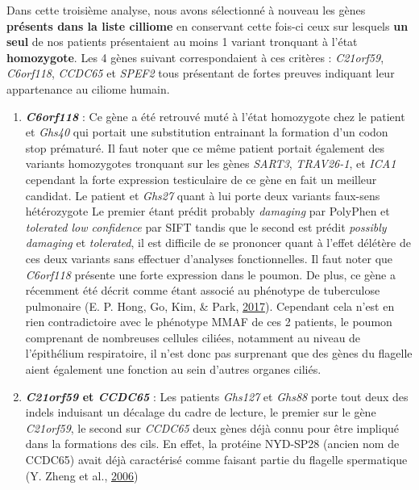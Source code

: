 \documentclass[12pt,twoside]{reedthesis}
\theoremstyle{definition}
\theoremstyle{definition}
\theoremstyle{remark}
\begin{document}
  Dans cette troisième analyse, nous avons sélectionné à nouveau les gènes
  \textbf{présents dans la liste cilliome} en conservant cette fois-ci
  ceux sur lesquels \textbf{un seul} de nos patients présentaient au moins
  1 variant tronquant à l'état \textbf{homozygote}. Les 4 gènes suivant
  correspondaient à ces critères : \emph{C21orf59}, \emph{C6orf118},
  \emph{CCDC65} et \emph{SPEF2} tous présentant de fortes preuves
  indiquant leur appartenance au ciliome humain.
  
  \begin{enumerate}
  \def\labelenumi{\arabic{enumi}.}
  \item
    \textbf{\emph{C6orf118}} : Ce gène a été retrouvé muté à l'état
    homozygote chez le patient et \emph{Ghs40} qui portait une
    substitution entrainant la formation d'un codon stop prématuré. Il
    faut noter que ce même patient portait également des variants
    homozygotes tronquant sur les gènes \emph{SART3}, \emph{TRAV26-1}, et
    \emph{ICA1} cependant la forte expression testiculaire de ce gène en
    fait un meilleur candidat. Le patient et \emph{Ghs27} quant à lui
    porte deux variants faux-sens hétérozygote Le premier étant prédit
    probably \emph{damaging} par PolyPhen et \emph{tolerated low
    confidence} par SIFT tandis que le second est prédit \emph{possibly
    damaging} et \emph{tolerated}, il est difficile de se prononcer quant
    à l'effet délétère de ces deux variants sans effectuer d'analyses
    fonctionnelles. Il faut noter que \emph{C6orf118} présente une forte
    expression dans le poumon. De plus, ce gène a récemment été décrit
    comme étant associé au phénotype de tuberculose pulmonaire (E. P.
    Hong, Go, Kim, \& Park, \protect\hyperlink{ref-Hong2017}{2017}).
    Cependant cela n'est en rien contradictoire avec le phénotype MMAF de
    ces 2 patients, le poumon comprenant de nombreuses cellules ciliées,
    notamment au niveau de l'épithélium respiratoire, il n'est donc pas
    surprenant que des gènes du flagelle aient également une fonction au
    sein d'autres organes ciliés.
  \item
    \textbf{\emph{C21orf59} et \emph{CCDC65}} : Les patients \emph{Ghs127}
    et \emph{Ghs88} porte tout deux des indels induisant un décalage du
    cadre de lecture, le premier sur le gène \emph{C21orf59}, le second
    sur \emph{CCDC65} deux gènes déjà connu pour être impliqué dans la
    formations des cils. En effet, la protéine NYD-SP28 (ancien nom de
    CCDC65) avait déjà caractérisé comme faisant partie du flagelle
    spermatique (Y. Zheng et al., \protect\hyperlink{ref-Zheng2006}{2006})

\end{enumerate}
\end{document}
